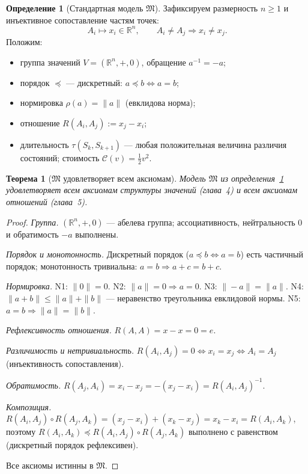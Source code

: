 \documentclass[12pt,a4paper,oneside]{book}
\theoremstyle{definition}
\newtheorem{definition}{Определение}[chapter]
\theoremstyle{plain}
\newtheorem{theorem}{Теорема}[chapter]
\theoremstyle{remark}
\newcommand{\Rel}{R}
\newcommand{\Values}{V}
\newcommand{\State}{S}
\newcommand{\comp}{\circ}
\newcommand{\Vord}{\preceq}
\newcommand{\norm}{\rho}
\newcommand{\ide}{e}
\newcommand{\Cost}{\mathcal C}
\begin{document}
\begin{definition}[Стандартная модель $\mathfrak M$]\label{def:model}
Зафиксируем размерность $n\ge1$ и инъективное сопоставление частям точек:
\[
A_i\longmapsto x_i\in\mathbb R^n,\qquad A_i\neq A_j\Rightarrow x_i\neq x_j.
\]
Положим:
\begin{itemize}
    \item группа значений $\Values=(\mathbb R^n,+,0)$, обращение $a^{-1}=-a$;
    \item порядок $\Vord$ --- дискретный: $a\Vord b\iff a=b$;
    \item нормировка $\norm(a)=\|a\|$ (евклидова норма);
    \item отношение $\Rel(A_i,A_j):=x_j-x_i$;
    \item длительность $\tau(\State_k,\State_{k+1})$ --- любая положительная величина
    различия состояний; стоимость $\Cost(v)=\tfrac12 v^2$.
\end{itemize}
\end{definition}

\begin{theorem}[$\mathfrak M$ удовлетворяет всем аксиомам]\label{thm:consistency}
Модель $\mathfrak M$ из определения~\ref{def:model} удовлетворяет всем аксиомам
структуры значений (глава~4) и всем аксиомам отношений (глава~5).
\end{theorem}

\begin{proof}
\emph{Группа.} $(\mathbb R^n,+,0)$ --- абелева группа; ассоциативность,
нейтральность $0$ и обратимость $-a$ выполнены.

\emph{Порядок и монотонность.} Дискретный порядок ($a\Vord b\iff a=b$) есть частичный
порядок; монотонность тривиальна: $a=b\Rightarrow a+c=b+c$.

\emph{Нормировка.} N1: $\|0\|=0$. N2: $\|a\|=0\Rightarrow a=0$. N3:
$\|-a\|=\|a\|$. N4: $\|a+b\|\le\|a\|+\|b\|$ --- неравенство треугольника евклидовой
нормы. N5: $a=b\Rightarrow\|a\|=\|b\|$.

\emph{Рефлексивность отношения.} $\Rel(A,A)=x-x=0=\ide$.

\emph{Различимость и нетривиальность.} $\Rel(A_i,A_j)=0\iff x_i=x_j\iff A_i=A_j$
(инъективность сопоставления).

\emph{Обратимость.} $\Rel(A_j,A_i)=x_i-x_j=-(x_j-x_i)=\Rel(A_i,A_j)^{-1}$.

\emph{Композиция.} $\Rel(A_i,A_j)\comp\Rel(A_j,A_k)=(x_j-x_i)+(x_k-x_j)=x_k-x_i
=\Rel(A_i,A_k)$, поэтому $\Rel(A_i,A_k)\Vord\Rel(A_i,A_j)\comp\Rel(A_j,A_k)$ выполнено
с равенством (дискретный порядок рефлексивен).

Все аксиомы истинны в $\mathfrak M$.
\end{proof}
\end{document}
